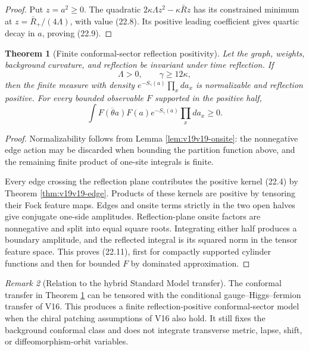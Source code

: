 \documentclass[11pt]{article}
\newtheorem{theorem}{Theorem}[section]
\theoremstyle{remark}
\newtheorem{remark}[theorem]{Remark}
\begin{document}
\begin{proof}
Put \(z=a^2\geq0\).  The quadratic
\(2\kappa\Lambda z^2-\kappa\bar Rz\) has its constrained minimum at
\(z=\bar R_+/(4\Lambda)\), with value (22.8).  Its positive leading
coefficient gives quartic decay in \(a\), proving (22.9).
\end{proof}

\begin{theorem}[Finite conformal-sector reflection positivity]
\label{thm:v19v19-finite}
Let the graph, weights, background curvature, and reflection be invariant
under time reflection.  If
\[
 \Lambda>0,\qquad\gamma\geq12\kappa,                           \tag{22.10}
\]
then the finite measure with density \(e^{-S_\gamma(a)}\prod_xda_x\) is
normalizable and reflection positive.  For every bounded observable \(F\)
supported in the positive half,
\[
 \int \overline{F(\theta a)}F(a)e^{-S_\gamma(a)}
 \prod_xda_x\geq0.                                             \tag{22.11}
\]
\end{theorem}

\begin{proof}
Normalizability follows from Lemma \ref{lem:v19v19-onsite}: the nonnegative
edge action may be discarded when bounding the partition function above,
and the remaining finite product of one-site integrals is finite.

Every edge crossing the reflection plane contributes the positive kernel
(22.4) by Theorem \ref{thm:v19v19-edge}.  Products of these kernels are
positive by tensoring their Fock feature maps.  Edges and onsite terms
strictly in the two open halves give conjugate one-side amplitudes.
Reflection-plane onsite factors are nonnegative and split into equal
square roots.  Integrating either half produces a boundary amplitude, and
the reflected integral is its squared norm in the tensor feature space.
This proves (22.11), first for compactly supported cylinder functions and
then for bounded \(F\) by dominated approximation.
\end{proof}

\begin{remark}[Relation to the hybrid Standard Model transfer]
\label{rem:v19v19-hybrid}
The conformal transfer in Theorem \ref{thm:v19v19-finite} can be tensored
with the conditional gauge--Higgs--fermion transfer of V16.  This produces
a finite reflection-positive conformal-sector model when the chiral
patching assumptions of V16 also hold.  It still fixes the background
conformal class and does not integrate transverse metric, lapse, shift, or
diffeomorphism-orbit variables.
\end{remark}
\end{document}

